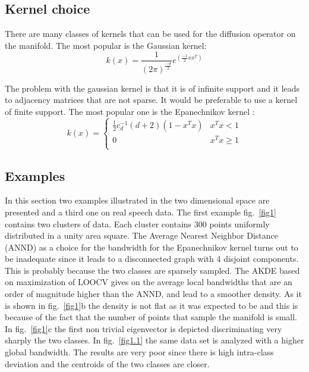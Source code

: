 \documentclass[12pt,letterpaper,doublespaced,ETD,dvips,proposal]{gtthesis}
\begin{document}
\begin{Body}
\subsection{Kernel choice}
There are many classes of kernels that can be used for the diffusion
operator on the manifold. The most popular is the Gaussian kernel:
\[
    k(x)=\frac{1}{(2\pi)^{\frac{-d}{2}}}e^{(\frac{-1}{2}xx^T)}
\]

The problem with the gaussian kernel is that it is of infinite
support and it leads to adjacency matrices that are not sparse. It
would be preferable to use a kernel of finite support. The most
popular one is the Epanechnikov kernel \cite{Silverman}:
\begin{equation}
    k(x)=\left\{
    \begin{array}{ll}
        \frac{1}{2}c_{d}^{-1}(d+2)(1-x^Tx) &  x^Tx<1 \\
        0   &   x^Tx\geq 1 \\
    \end{array}
 \right.
\end{equation}

\subsection{Examples}
In this section two examples illustrated in the two dimensional
space are presented and a third one on real speech data. The first
example fig.~\ref{fig1} contains two clusters of data. Each cluster
contains 300 points uniformly distributed in a unity area square.
The Average Nearest Neighbor Distance (ANND) as a choice for the
bandwidth for the Epanechnikov kernel turns out to be inadequate
since it leads to a disconnected graph with 4 disjoint components.
This is probably because the two classes are sparsely sampled. The
AKDE based on maximization of LOOCV gives on the average local
bandwidths that are an order of magnitude higher than the ANND, and
lead to a smoother density. As it is shown in fig.~\ref{fig1}b the
density is not flat as it was expected to be and this is because of
the fact that the number of points that sample the manifold is
small. In fig.~\ref{fig1}c the first non trivial eigenvector is
depicted discriminating very sharply the two classes. In
fig.~\ref{fig1.1} the same data set is analyzed with a higher global
bandwidth. The results are very poor since there is high intra-class
deviation and the centroids of the two classes are closer.


\end{Body}
\end{document}
